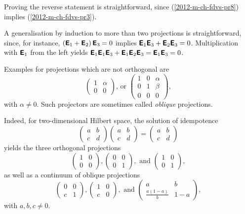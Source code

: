 {Proving the reverse statement is straightforward, since (\ref{2012-m-ch-fdvs-pr8}) implies  (\ref{2012-m-ch-fdvs-pr3}).

A generalisation by induction to more than two projections is straightforward,
since, for instance,
$\left(\textsf{\textbf{E}}_1+\textsf{\textbf{E}}_2\right)\textsf{\textbf{E}}_3=0$
implies
$ \textsf{\textbf{E}}_1\textsf{\textbf{E}}_3+\textsf{\textbf{E}}_2\textsf{\textbf{E}}_3=0$.
Multiplication with $\textsf{\textbf{E}}_1$ from the left yields
$
\textsf{\textbf{E}}_1\textsf{\textbf{E}}_1\textsf{\textbf{E}}_3+\textsf{\textbf{E}}_1\textsf{\textbf{E}}_2\textsf{\textbf{E}}_3=
\textsf{\textbf{E}}_1 \textsf{\textbf{E}}_3=
0$.
 \eproof }


{\color{blue}
\bexample
Examples for projections which are not orthogonal are
$$\begin{pmatrix}
1&\alpha \\
0&0
\end{pmatrix}
\text{,  or }
\begin{pmatrix}
1&0&\alpha \\
0&1&\beta \\
0&0&0
\end{pmatrix},$$
with $\alpha \neq 0$.
Such projectors are sometimes called
{\em oblique} projections.
\eexample
}


{\color{blue}
\bexample
Indeed, for two-dimensional Hilbert space, the solution
of idempotence
$$
\begin{pmatrix}
a&b \\
c&d
\end{pmatrix}
\begin{pmatrix}
a&b \\
c&d
\end{pmatrix}
=
\begin{pmatrix}
a&b \\
c&d
\end{pmatrix}
$$
yields the three orthogonal projections
$$
\begin{pmatrix}
1&0 \\
0&0
\end{pmatrix},
\begin{pmatrix}
0&0 \\
0&1
\end{pmatrix},\text{ and }
\begin{pmatrix}
1&0 \\
0&1
\end{pmatrix},
$$
as well as a continuum of oblique projections
$$
\begin{pmatrix}
0&0 \\
c&1
\end{pmatrix},
\begin{pmatrix}
1&0 \\
c&0
\end{pmatrix},\text{ and }
\begin{pmatrix}
a&b \\
\frac{a(1-a)}{b}&1-a
\end{pmatrix},
$$
with $a,b,c \neq 0$.
\eexample
}


